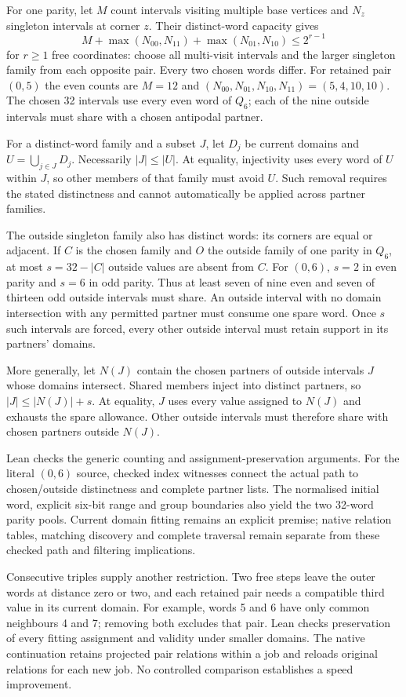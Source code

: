 \documentclass[11pt,a4paper]{article}
\begin{document}
For one parity, let $M$ count intervals visiting multiple base vertices and
$N_z$ singleton intervals at corner $z$. Their distinct-word capacity gives
\[
\boxed{M+\max(N_{00},N_{11})+\max(N_{01},N_{10})\le2^{r-1}}
\]
for $r\ge1$ free coordinates: choose all multi-visit intervals and the larger
singleton family from each opposite pair. Every two chosen words differ.
For retained pair $(0,5)$ the even counts are $M=12$ and
$(N_{00},N_{01},N_{10},N_{11})=(5,4,10,10)$.
The chosen 32 intervals use every even word of $Q_6$; each of the nine
outside intervals must share with a chosen antipodal partner.

For a distinct-word family and a subset $J$, let $D_j$ be current domains
and $U=\bigcup_{j\in J}D_j$. Necessarily $|J|\le|U|$.
At equality, injectivity uses every word of $U$ within $J$, so other
members of that family must avoid $U$. Such removal requires the stated
distinctness and cannot automatically be applied across partner families.

The outside singleton family also has distinct words: its corners are equal
or adjacent. If $C$ is the chosen family and $O$ the outside family of one
parity in $Q_6$, at most $s=32-|C|$ outside values are absent from $C$.
For $(0,6)$, $s=2$ in even parity and $s=6$ in odd parity. Thus at least
seven of nine even and seven of thirteen odd outside intervals must share.
An outside interval with no domain intersection with any permitted partner
must consume one spare word. Once $s$ such intervals are forced, every
other outside interval must retain support in its partners' domains.

More generally, let $N(J)$ contain the chosen partners of outside intervals
$J$ whose domains intersect. Shared members inject into distinct partners,
so $|J|\le|N(J)|+s$. At equality, $J$ uses every value assigned to $N(J)$
and exhausts the spare allowance. Other outside intervals must therefore
share with chosen partners outside $N(J)$.

Lean checks the generic counting and assignment-preservation arguments.
For the literal $(0,6)$ source, checked index witnesses connect the actual
path to chosen/outside distinctness and complete partner lists. The normalised
initial word, explicit six-bit range and group boundaries also yield the
two 32-word parity pools. Current domain fitting remains an explicit premise;
native relation tables, matching discovery and complete traversal remain
separate from these checked path and filtering implications.

Consecutive triples supply another restriction. Two free steps leave the
outer words at distance zero or two, and each retained pair needs a compatible
third value in its current domain. For example, words 5 and 6 have only
common neighbours 4 and 7; removing both excludes that pair.
Lean checks preservation of every fitting assignment and validity under
smaller domains. The native continuation retains projected pair relations
within a job and reloads original relations for each new job.
No controlled comparison establishes a speed improvement.
\end{document}
